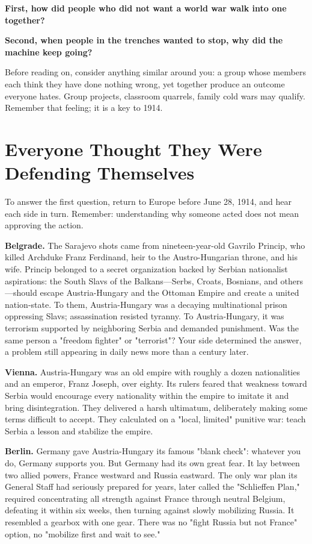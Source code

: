 \textbf{First, how did people who did not want a world war walk into one together?}

\textbf{Second, when people in the trenches wanted to stop, why did the machine keep going?}

Before reading on, consider anything similar around you: a group whose members each think they have done nothing wrong, yet together produce an outcome everyone hates. Group projects, classroom quarrels, family cold wars may qualify. Remember that feeling; it is a key to 1914.

\section[Everyone Claimed Self-Defense]{Everyone Thought They Were Defending Themselves}
To answer the first question, return to Europe before June 28, 1914, and hear each side in turn. Remember: understanding why someone acted does not mean approving the action.

\textbf{Belgrade.} The Sarajevo shots came from nineteen-year-old Gavrilo Princip, who killed Archduke Franz Ferdinand, heir to the Austro-Hungarian throne, and his wife. Princip belonged to a secret organization backed by Serbian nationalist aspirations: the South Slavs of the Balkans---Serbs, Croats, Bosnians, and others---should escape Austria-Hungary and the Ottoman Empire and create a united nation-state. To them, Austria-Hungary was a decaying multinational prison oppressing Slavs; assassination resisted tyranny. To Austria-Hungary, it was terrorism supported by neighboring Serbia and demanded punishment. Was the same person a "freedom fighter" or "terrorist"? Your side determined the answer, a problem still appearing in daily news more than a century later.

\textbf{Vienna.} Austria-Hungary was an old empire with roughly a dozen nationalities and an emperor, Franz Joseph, over eighty. Its rulers feared that weakness toward Serbia would encourage every nationality within the empire to imitate it and bring disintegration. They delivered a harsh ultimatum, deliberately making some terms difficult to accept. They calculated on a "local, limited" punitive war: teach Serbia a lesson and stabilize the empire.

\textbf{Berlin.} Germany gave Austria-Hungary its famous "blank check": whatever you do, Germany supports you. But Germany had its own great fear. It lay between two allied powers, France westward and Russia eastward. The only war plan its General Staff had seriously prepared for years, later called the "Schlieffen Plan," required concentrating all strength against France through neutral Belgium, defeating it within six weeks, then turning against slowly mobilizing Russia. It resembled a gearbox with one gear. There was no "fight Russia but not France" option, no "mobilize first and wait to see."

